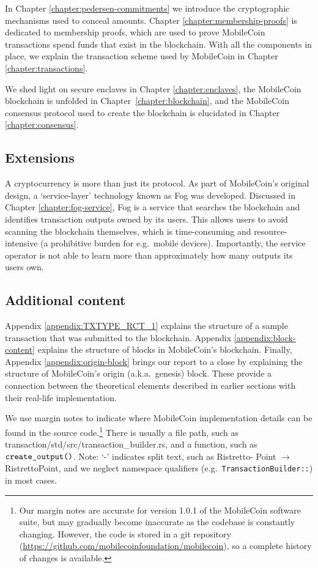 In Chapter \ref{chapter:pedersen-commitments} we introduce the cryptographic mechanisms used to conceal amounts. Chapter \ref{chapter:membership-proofs} is dedicated to membership proofs, which are used to prove MobileCoin transactions spend funds that exist in the blockchain. With all the components in place, we explain the transaction scheme used by MobileCoin in Chapter \ref{chapter:transactions}.

We shed light on secure enclaves in Chapter \ref{chapter:enclaves}, the MobileCoin blockchain is unfolded in Chapter~\ref{chapter:blockchain}, and the MobileCoin consensus protocol used to create the blockchain is elucidated in Chapter \ref{chapter:consensus}.


\subsection{Extensions}

A cryptocurrency is more than just its protocol. As part of MobileCoin's original design, a `service-layer' technology known as Fog was developed. Discussed in Chapter \ref{chapter:fog-service}, Fog is a service that searches the blockchain and identifies transaction outputs owned by its users. This allows users to avoid scanning the blockchain themselves, which is time-consuming and resource-intensive (a prohibitive burden for e.g.\ mobile devices). Importantly, the service operator is not able to learn more than approximately how many outputs its users own.


\subsection{Additional content}

Appendix \ref{appendix:TXTYPE_RCT_1} explains the structure of a sample transaction that was submitted to the blockchain. Appendix \ref{appendix:block-content} explains the structure of blocks in MobileCoin's blockchain. Finally, Appendix \ref{appendix:origin-block} brings our report to a close by explaining the structure of MobileCoin's origin (a.k.a.\ genesis) block. These provide a connection between the theoretical elements described in earlier sections with their real-life implementation.

We use margin notes to indicate where MobileCoin implementation details can be found in the source code.\footnote{Our margin notes are accurate for version 1.0.1 of the MobileCoin software suite, but may gradually become inaccurate as the codebase is constantly changing. However, the code is stored in a git repository (\url{https://github.com/mobilecoinfoundation/mobilecoin}), so a complete history of changes is available.} There is usually a file path, such as transaction/std/src/transaction\_builder.rs, and a function, such as \(\textrm{{\tt create\_output()}}\). Note: `-' indicates split text, such as Ristretto- Point $\rightarrow$ RistrettoPoint, and we neglect namespace qualifiers (e.g.\ {\tt TransactionBuilder::}) in most cases.

